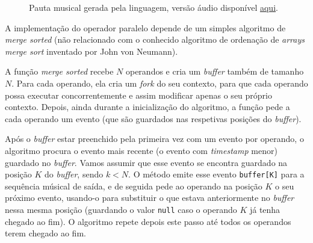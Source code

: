 \begin{figure}[ht]
  \centering
  {%
  \setlength{\fboxsep}{0pt}%
  \setlength{\fboxrule}{0pt}%
  }%
  \caption{Pauta musical gerada pela linguagem, versão áudio disponível \href{https://drive.google.com/open?id=1ENTm3hZonYHyQIOgRZ8TQ1Qz-AfRLt2I}{\underline{aqui}}\protect\footnotemark.}
  \label{fig:ops-parallel}
\end{figure}

A implementação do operador paralelo depende de um simples algoritmo de \textit{merge sorted} (não relacionado com o conhecido algoritmo de ordenação de \textit{arrays merge sort} inventado por John von Neumann).

A função \textit{merge sorted} recebe $N$ operandos e cria um \textit{buffer} também de tamanho $N$. Para cada operando, ela cria um \textit{fork} do seu contexto, para que cada operando possa executar concorrentemente e assim modificar apenas o seu próprio contexto. Depois, ainda durante a inicialização do algoritmo, a função pede a cada operando um evento (que são guardados nas respetivas posições do \textit{buffer}).

Após o \textit{buffer} estar preenchido pela primeira vez com um evento por operando, o algoritmo procura o evento mais recente (o evento com \textit{timestamp} menor) guardado no \textit{buffer}. Vamos assumir que esse evento se encontra guardado na posição $K$ do \textit{buffer}, sendo $k < N$. O método emite esse evento \texttt{buffer[K]} para a sequência músical de saída, e de seguida pede ao operando na posição $K$ o seu próximo evento, usando-o para substituir o que estava anteriormente no \textit{buffer} nessa mesma posição (guardando o valor \texttt{null} caso o operando $K$ já tenha chegado ao fim). O algoritmo repete depois este passo até todos os operandos terem chegado ao fim.

